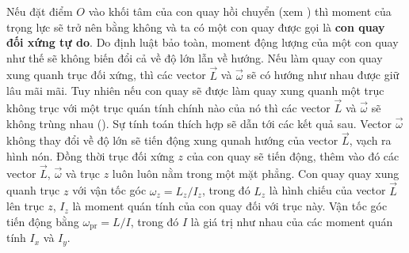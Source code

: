 Nếu đặt điểm $O$ vào khối tâm của con quay hồi chuyển (xem ) thì moment của trọng lực sẽ trở nên bằng không và ta có một con quay được gọi là \textbf{con quay đối xứng tự do}. Do định luật bảo toàn, moment động lượng của một con quay như thế sẽ không biến đổi cả về độ lớn lẫn về hướng. Nếu làm quay con quay xung quanh trục đối xứng, thì các vector $\vec{L}$ và $\vec{\omega}$ sẽ có hướng như nhau được giữ lâu mãi mãi. Tuy nhiên nếu con quay sẽ được làm quay xung quanh một trục không trục với một trục quán tính chính nào của nó thì các vector $\vec{L}$ và $\vec{\omega}$ sẽ không trùng nhau (). Sự tính toán thích hợp sẽ dẫn tới các kết quả sau. Vector $\vec{\omega}$ không thay đổi về độ lớn sẽ tiến động xung qunah hướng của vector $\vec{L}$, vạch ra hình nón. Đồng thời trục đối xứng $z$ của con quay sẽ tiến động, thêm vào đó các vector $\vec{L}$, $\vec{\omega}$ và trục $z$ luôn luôn nằm trong một mặt phẳng. Con quay quay xung quanh trục $z$ với vận tốc góc $\omega_z=L_z/I_z$, trong đó $L_z$ là hình chiếu của vector $\vec{L}$ lên trục $z$, $I_z$ là moment quán tính của con quay đối với trục này. Vận tốc góc tiến động bằng $\omega_{\text{pr}}=L/I$, trong đó $I$ là giá trị như nhau của các moment quán tính $I_x$ và $I_y$.
